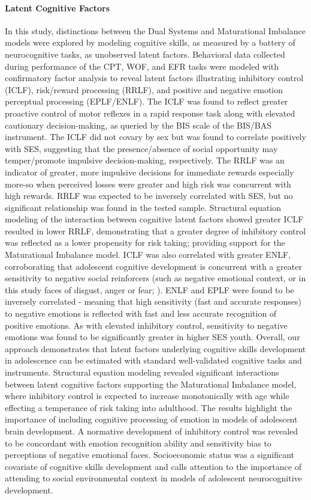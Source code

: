 \documentclass[utf8]{stylesheet}
\begin{document}
\paragraph*{Latent Cognitive Factors} In this study, distinctions between the Dual Systems and Maturational Imbalance models were explored by modeling cognitive skills, as measured by a battery of neurocognitive tasks, as unobserved latent factors. Behavioral data collected during performance of the CPT, WOF, and EFR tasks were modeled with confirmatory factor analysis to reveal latent factors illustrating inhibitory control (ICLF), risk/reward processing (RRLF), and positive and negative emotion perceptual processing (EPLF/ENLF). The ICLF was found to reflect greater proactive control of motor reflexes in a rapid response task along with elevated cautionary decision-making, as queried by the BIS scale of the BIS/BAS instrument. The ICLF did not covary by sex but was found to correlate positively with SES, suggesting that the presence/absence of social opportunity may temper/promote impulsive decision-making, respectively. The RRLF was an indicator of greater, more impulsive decisions for immediate rewards \textemdash especially more-so when perceived losses were greater and high risk was concurrent with high rewards. RRLF was expected to be inversely correlated with SES, but no significant relationship was found in the tested sample. Structural equation modeling of the interaction between cognitive latent factors showed greater ICLF resulted in lower RRLF, demonstrating that a greater degree of inhibitory control was reflected as a lower propensity for risk taking; providing support for the Maturational Imbalance model. ICLF was also correlated with greater ENLF, corroborating that adolescent cognitive development is concurrent with a greater sensitivity to negative social reinforcers (such as negative emotional context, or in this study faces of disgust, anger or fear; \cite{jones2014adolescent, rosenbaum2020valence}). ENLF and EPLF were found to be inversely correlated - meaning that high sensitivity (fast and accurate responses) to negative emotions is reflected with fast and less accurate recognition of positive emotions. As with elevated inhibitory control, sensitivity to negative emotions was found to be significantly greater in higher SES youth. 
Overall, our approach demonstrates that latent factors underlying cognitive skills development in adolescence can be estimated with standard well-validated cognitive tasks and instruments. Structural equation modeling revealed significant interactions between latent cognitive factors supporting the Maturational Imbalance model, where inhibitory control is expected to increase monotonically with age while effecting a temperance of risk taking into adulthood. The results highlight the importance of including cognitive processing of emotion in models of adolescent brain development. A normative development of inhibitory control was revealed to be concordant with emotion recognition ability and sensitivity bias to perceptions of negative emotional faces. Socioeconomic status was a significant covariate of cognitive skills development and calls attention to the importance of attending to social environmental context in models of adolescent neurocognitive development.
\vspace{2pt}
\end{document}
